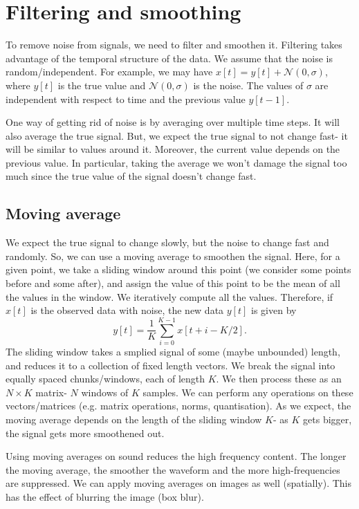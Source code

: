 \documentclass[a4paper, openany]{memoir}
\begin{document}
\section{Filtering and smoothing}
To remove noise from signals, we need to filter and smoothen it. Filtering takes advantage of the temporal structure of the data. We assume that the noise is random/independent. For example, we may have $x[t] = y[t] + \mathcal{N}(0, \sigma)$, where $y[t]$ is the true value and $\mathcal{N}(0, \sigma)$ is the noise. The values of $\sigma$ are independent with respect to time and the previous value $y[t-1]$.

One way of getting rid of noise is by averaging over multiple time steps. It will also average the true signal. But, we expect the true signal to not change fast- it will be similar to values around it. Moreover, the current value depends on the previous value. In particular, taking the average we won't damage the signal too much since the true value of the signal doesn't change fast.

\subsection{Moving average}
We expect the true signal to change slowly, but the noise to change fast and randomly. So, we can use a moving average to smoothen the signal. Here, for a given point, we take a sliding window around this point (we consider some points before and some after), and assign the value of this point to be the mean of all the values in the window. We iteratively compute all the values. Therefore, if $x[t]$ is the observed data with noise, the new data $y[t]$ is given by
\[y[t] = \frac{1}{K} \sum_{i=0}^{K-1} x[t+i-K/2].\]
The sliding window takes a smplied signal of some (maybe unbounded) length, and reduces it to a collection of fixed length vectors. We break the signal into equally spaced chunks/windows, each of length $K$. We then process these as an $N \times K$ matrix- $N$ windows of $K$ samples. We can perform any operations on these vectors/matrices (e.g. matrix operations, norms, quantisation). As we expect, the moving average depends on the length of the sliding window $K$- as $K$ gets bigger, the signal gets more smoothened out.

Using moving averages on sound reduces the high frequency content. The longer the moving average, the smoother the waveform and the more high-frequencies are suppressed. We can apply moving averages on images as well (spatially). This has the effect of blurring the image (box blur).
\end{document}
